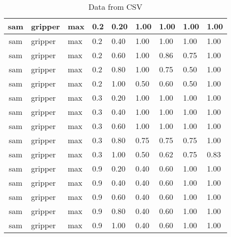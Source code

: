 \begin{table}[ht]
\begin{tabular}{c}
sam & gripper & max & 0.2 & 0.20 & 1.00 & 1.00 & 1.00 & 1.00 \\ \hline
sam & gripper & max & 0.2 & 0.40 & 1.00 & 1.00 & 1.00 & 1.00 \\ \hline
sam & gripper & max & 0.2 & 0.60 & 1.00 & 0.86 & 0.75 & 1.00 \\ \hline
sam & gripper & max & 0.2 & 0.80 & 1.00 & 0.75 & 0.50 & 1.00 \\ \hline
sam & gripper & max & 0.2 & 1.00 & 0.50 & 0.60 & 0.50 & 1.00 \\ \hline
sam & gripper & max & 0.3 & 0.20 & 1.00 & 1.00 & 1.00 & 1.00 \\ \hline
sam & gripper & max & 0.3 & 0.40 & 1.00 & 1.00 & 1.00 & 1.00 \\ \hline
sam & gripper & max & 0.3 & 0.60 & 1.00 & 1.00 & 1.00 & 1.00 \\ \hline
sam & gripper & max & 0.3 & 0.80 & 0.75 & 0.75 & 0.75 & 1.00 \\ \hline
sam & gripper & max & 0.3 & 1.00 & 0.50 & 0.62 & 0.75 & 0.83 \\ \hline
sam & gripper & max & 0.9 & 0.20 & 0.40 & 0.60 & 1.00 & 1.00 \\ \hline
sam & gripper & max & 0.9 & 0.40 & 0.40 & 0.60 & 1.00 & 1.00 \\ \hline
sam & gripper & max & 0.9 & 0.60 & 0.40 & 0.60 & 1.00 & 1.00 \\ \hline
sam & gripper & max & 0.9 & 0.80 & 0.40 & 0.60 & 1.00 & 1.00 \\ \hline
sam & gripper & max & 0.9 & 1.00 & 0.40 & 0.60 & 1.00 & 1.00 \\ \hline
\end{tabular}
\caption{Data from CSV}
\label{tab:csv_data}
\end{table}
